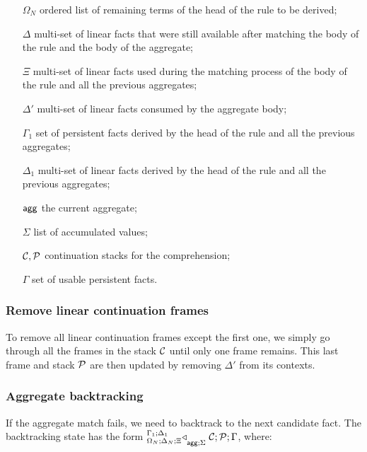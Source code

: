 \begin{enumerate}
   \item[$\Omega_N$] ordered list of remaining terms of the head of the rule to
   be derived;
   \item[$\Delta$] multi-set of linear facts that were still available after
   matching the body of the rule and the body of the aggregate;
   \item[$\Xi$] multi-set of linear facts used during the matching process of
   the body of the rule and all the previous aggregates;
   \item[$\Delta'$] multi-set of linear facts consumed by the aggregate body;
   \item[$\Gamma_{1}$] set of persistent facts derived by the head of the rule
   and all the previous aggregates;
   \item[$\Delta_{1}$] multi-set of linear facts derived by the head of the
   rule and all the previous aggregates;
   \item[$\mathsf{agg}$] the current aggregate;
   \item[$\Sigma$] list of accumulated values;
   \item[$\mathcal{C}, \mathcal{P}$] continuation stacks for the comprehension;
   \item[$\Gamma$] set of usable persistent facts.
\end{enumerate}

\subsubsection{Remove linear continuation frames}

To remove all linear continuation frames except the first one, we simply go
through all the frames in the stack $\mathcal{C}$ until only one frame remains.
This last frame and stack $\mathcal{P}$ are then updated by removing $\Delta'$
from its contexts.



\subsubsection{Aggregate backtracking}

If the aggregate match fails, we need to backtrack to the next candidate fact.
The backtracking state 
has the form
${{}^{\Gamma_1; \Delta_1}_{\Omega_N ; \Delta_N ; \Xi}\triangleleft}_{\mathsf{agg} ; \Sigma} \; \mathcal{C} ; \mathcal{P} ; \Gamma$, where:

